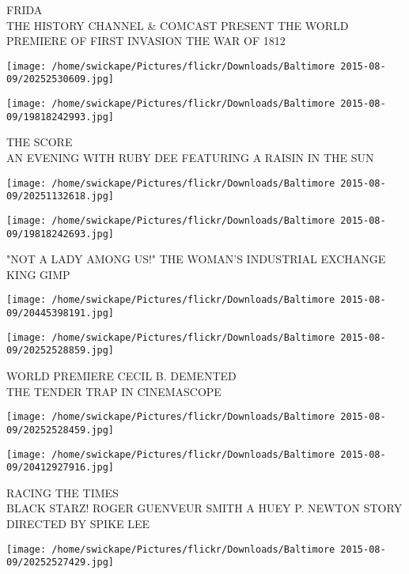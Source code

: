 \documentclass[10pt,letterpaper]{article}
\begin{document}
FRIDA\\
THE HISTORY CHANNEL \& COMCAST PRESENT THE WORLD PREMIERE OF FIRST INVASION THE WAR OF 1812\\
\pagebreak

\texttt{[image: /home/swickape/Pictures/flickr/Downloads/Baltimore 2015-08-09/20252530609.jpg]}

\vspace{0.25in}
\texttt{[image: /home/swickape/Pictures/flickr/Downloads/Baltimore 2015-08-09/19818242993.jpg]}

THE SCORE\\
AN EVENING WITH RUBY DEE FEATURING A RAISIN IN THE SUN\\
\pagebreak

\texttt{[image: /home/swickape/Pictures/flickr/Downloads/Baltimore 2015-08-09/20251132618.jpg]}

\vspace{0.25in}
\texttt{[image: /home/swickape/Pictures/flickr/Downloads/Baltimore 2015-08-09/19818242693.jpg]}

"NOT A LADY AMONG US!" THE WOMAN'S INDUSTRIAL EXCHANGE\\
KING GIMP\\
\pagebreak

\texttt{[image: /home/swickape/Pictures/flickr/Downloads/Baltimore 2015-08-09/20445398191.jpg]}

\vspace{0.25in}
\texttt{[image: /home/swickape/Pictures/flickr/Downloads/Baltimore 2015-08-09/20252528859.jpg]}

WORLD PREMIERE CECIL B. DEMENTED\\
THE TENDER TRAP IN CINEMASCOPE\\
\pagebreak

\texttt{[image: /home/swickape/Pictures/flickr/Downloads/Baltimore 2015-08-09/20252528459.jpg]}

\vspace{0.25in}
\texttt{[image: /home/swickape/Pictures/flickr/Downloads/Baltimore 2015-08-09/20412927916.jpg]}

RACING THE TIMES\\
BLACK STARZ!  ROGER GUENVEUR SMITH A HUEY P. NEWTON STORY DIRECTED BY SPIKE LEE\\
\pagebreak

\texttt{[image: /home/swickape/Pictures/flickr/Downloads/Baltimore 2015-08-09/20252527429.jpg]}
\end{document}
